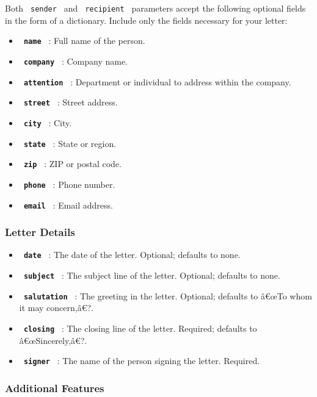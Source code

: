 Both \texttt{\ sender\ } and \texttt{\ recipient\ } parameters accept
the following optional fields in the form of a dictionary. Include only
the fields necessary for your letter:

\begin{itemize}
\tightlist
\item
  \textbf{\texttt{\ name\ }} : Full name of the person.
\item
  \textbf{\texttt{\ company\ }} : Company name.
\item
  \textbf{\texttt{\ attention\ }} : Department or individual to address
  within the company.
\item
  \textbf{\texttt{\ street\ }} : Street address.
\item
  \textbf{\texttt{\ city\ }} : City.
\item
  \textbf{\texttt{\ state\ }} : State or region.
\item
  \textbf{\texttt{\ zip\ }} : ZIP or postal code.
\item
  \textbf{\texttt{\ phone\ }} : Phone number.
\item
  \textbf{\texttt{\ email\ }} : Email address.
\end{itemize}

\subsubsection{Letter Details}\label{letter-details}

\begin{itemize}
\tightlist
\item
  \textbf{\texttt{\ date\ }} : The date of the letter. Optional;
  defaults to none.
\item
  \textbf{\texttt{\ subject\ }} : The subject line of the letter.
  Optional; defaults to none.
\item
  \textbf{\texttt{\ salutation\ }} : The greeting in the letter.
  Optional; defaults to â€œTo whom it may concern,â€?.
\item
  \textbf{\texttt{\ closing\ }} : The closing line of the letter.
  Required; defaults to â€œSincerely,â€?.
\item
  \textbf{\texttt{\ signer\ }} : The name of the person signing the
  letter. Required.
\end{itemize}

\subsubsection{Additional Features}\label{additional-features}

